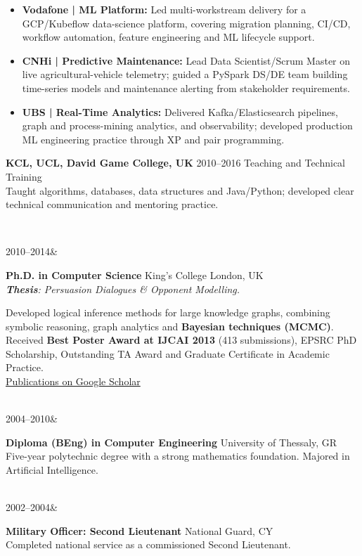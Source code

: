 \documentclass[]{../../../../friggeri-cv}
\renewcommand{\entry}[4]{%
  \parbox[t]{\dimexpr\textwidth-\entryleftinset\relax}{%
    \textbf{#2}%
    {\footnotesize\addfontfeature{Color=lightgray}\hspace{0.6em}#1}%
    \hfill%
    {\small\color{textcolor} #3}\\%
    #4\vspace{\parsep}%
  }\\}
\renewcommand{\entrytwo}[4]{%
  #1&\parbox[t]{14cm}{%
    \textbf{#2}%
    \hfill%
    {\small\color{textcolor} #3}\\%
    #4\vspace{\parsep}%
  }\\}
\begin{document}
\begin{entrylist}
{\begin{itemize}[leftmargin=1.1em, itemsep=2pt, topsep=3pt, parsep=0pt]
            \item \small\textbf{Vodafone | ML Platform:} Led multi-workstream delivery for a GCP/Kubeflow data-science platform, covering migration planning, CI/CD, workflow automation, feature engineering and ML lifecycle support.
            \item \small\textbf{CNHi | Predictive Maintenance:} Lead Data Scientist/Scrum Master on live agricultural-vehicle telemetry; guided a PySpark DS/DE team building time-series models and maintenance alerting from stakeholder requirements.
            \item \small\textbf{UBS | Real-Time Analytics:} Delivered Kafka/Elasticsearch pipelines, graph and process-mining analytics, and observability; developed production ML engineering practice through XP and pair programming.
        \end{itemize}
    }
    \entry
    {2010--2016}
    {KCL, UCL, David Game College, UK}
    {Teaching and Technical Training}
    {\small Taught algorithms, databases, data structures and Java/Python; developed clear technical communication and mentoring practice.}
\end{entrylist}
\newpage
\setlength{\parskip}{2pt}
\setlength{\parsep}{0pt}
\begin{entrylist2}
    \entrytwo
        {\small 2010--2014}
        {\small Ph.D. in Computer Science}
        {\small King's College London, UK}
        {\small \emph{\textbf{Thesis}: Persuasion Dialogues \& Opponent Modelling.}

        {\small Developed logical inference methods for large knowledge graphs, combining symbolic reasoning, graph analytics and \textbf{Bayesian techniques (MCMC)}. Received \textbf{Best Poster Award at IJCAI 2013} (413 submissions), EPSRC PhD Scholarship, Outstanding TA Award and Graduate Certificate in Academic Practice.
        \\ \href{https://scholar.google.com/citations?hl=en&user=Rr3KTx8AAAAJ}{Publications on Google Scholar}}
        }
    \entrytwo
        {\small 2004--2010}
        {\small Diploma (BEng) in Computer Engineering}
        {\small University of Thessaly, GR}
        {\small Five-year polytechnic degree with a strong mathematics foundation. Majored in Artificial Intelligence.}
    \entrytwo
        {\small 2002--2004}
        {\small Military Officer: Second Lieutenant}
        {\small National Guard, CY}
        {\small Completed national service as a commissioned Second Lieutenant.}
\end{entrylist2}
\end{document}
